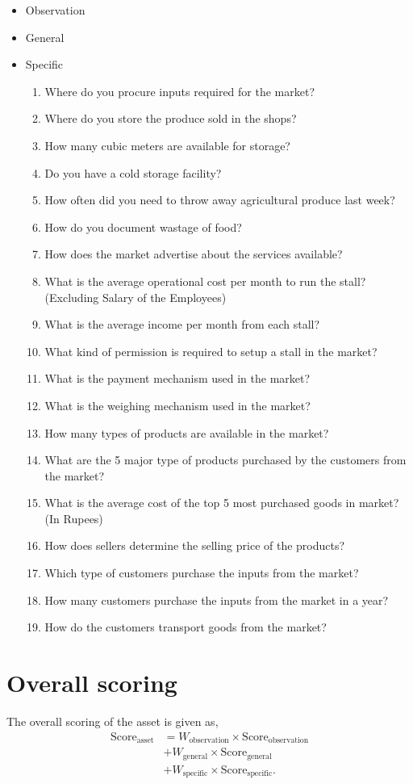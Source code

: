 \documentclass[oneside,twocolumn]{article}
\newcommand{\tsub}[2]{\text{#1}_{\text{#2}}}
\newcommand{\tsubb}[2]{#1_{\text{#2}}}
\begin{document}
\begin{itemize}
\item Observation
\item General
\item Specific
  \begin{enumerate}
  \item Where do you procure inputs required for the market?
  \item Where do you store the produce sold in the shops?
  \item How many cubic meters are available for storage?
  \item Do you have a cold storage facility?
  \item How often did you need to throw away agricultural produce last week?
  \item How do you document wastage of food?
  \item How does the market advertise about the services available?
  \item What is the average operational cost per month to run the stall?(Excluding Salary of the Employees)
  \item What is the average income per month from each stall?
  \item What kind of permission is required to setup a stall in the market?
  \item What is the payment mechanism used in the market?
  \item What is the weighing mechanism used in the market?
  \item How many types of products are available in the market?
  \item What are the 5 major type of products purchased by the customers from the market?
  \item What is the average cost of the top 5 most purchased goods in market?(In Rupees)
  \item How does sellers determine the selling price of the products?
  \item Which type of customers purchase the inputs from the market?
  \item How many customers purchase the inputs from the market in a year?
  \item How do the customers transport goods from the market?
  \end{enumerate}
\end{itemize}

\section{Overall scoring}
The overall scoring of the asset is given  as,
\begin{align*}
  \tsub{Score}{asset} &= \tsubb{W}{observation} \times \tsub{Score}{observation} \\
  &+ \tsubb{W}{general} \times \tsub{Score}{general} \\
  &+ \tsubb{W}{specific} \times \tsub{Score}{specific}.
\end{align*}
\end{document}
